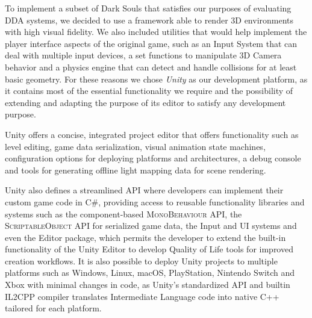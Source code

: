 To implement a subset of Dark Souls that satisfies our purposes of evaluating DDA systems, we decided to use a framework able to render 3D environments with high visual fidelity. We also included utilities that would help implement the player interface aspects of the original game, such as an Input System that can deal with multiple input devices, a set functions to manipulate 3D Camera behavior and a physics engine that can detect and handle collisions for at least basic geometry. For these reasons we chose \emph{Unity} as our development platform, as it contains most of the essential functionality we require and the possibility of extending and adapting the purpose of its editor to satisfy any development purpose.

Unity offers a concise, integrated project editor that offers functionality such as level editing, game data serialization, visual animation state machines, configuration options for deploying platforms and architectures, a debug console and tools for generating offline light mapping data for scene rendering.

Unity also defines a streamlined API where developers can implement their custom game code in \textsc{C\#}, providing access to reusable functionality libraries and systems such as the component-based \textsc{MonoBehaviour} API, the \textsc{ScriptableObject} API for serialized game data, the Input and UI systems and even the Editor package, which permits the developer to extend the built-in functionality of the Unity Editor to develop Quality of Life tools for improved creation workflows. It is also possible to deploy Unity projects to multiple platforms such as Windows, Linux, macOS, PlayStation, Nintendo Switch and Xbox with minimal changes in code, as Unity's standardized API and builtin \textsc{IL2CPP} compiler translates Intermediate Language code into native \textsc{C++} tailored for each platform.


